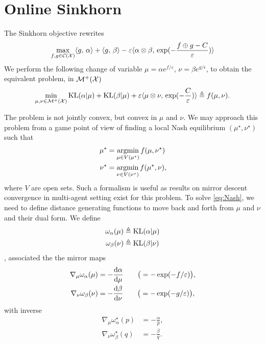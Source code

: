 \documentclass[a4paper, 10pt]{article}
\begin{document}
\section{Online Sinkhorn}

The Sinkhorn objective rewrites
\begin{equation}
    \max_{f, g \in \mathcal{C}(\mathcal{X})} \langle g,\,\alpha\rangle + \langle g,\,\beta\rangle
     - \varepsilon \langle \alpha \otimes \beta,\,\exp(-\frac{f \oplus g - C}{\varepsilon})
     \rangle
\end{equation}
We perform the following change of variable $\mu = \alpha e^{f / \varepsilon}$,
$\nu = \beta e^{g / \epsilon}$, to obtain the equivalent problem, in $\mathcal{M}^+(\mathcal{X})$
\begin{equation}
    \min_{\mu,\nu \in \mathcal{M}^+(\mathcal{X})} \text{KL}(\alpha|\mu) + \text{KL}(\beta|\mu) + 
    \varepsilon \langle \mu \otimes \nu,\,\exp(-\frac{C}{\varepsilon})\rangle \triangleq f(\mu, \nu).
\end{equation}

The problem is not jointly convex, but convex in $\mu$ and $\nu$.
We may approach this problem from a game point of view of finding
 a local Nash equilibrium $(\mu^\star,\nu^\star)$ such that
\begin{align}\label{eq:Nash}
    \mu^\star &= \operatorname*{argmin}_{\mu \in V(\mu^\star)} f(\mu, \nu^\star) \\
    \nu^\star &= \operatorname*{argmin}_{\nu \in V(\nu^\star)} f(\mu^\star, \nu),
\end{align}
where $V$ are open sets. Such a formalism is useful as results on mirror descent
convergence in multi-agent setting exist for this problem. To solve
\eqref{eq:Nash}, we need to define distance generating functions to move back
and forth from $\mu$ and $\nu$ and their dual form. We define
\begin{align}
    \omega_\alpha(\mu) &\triangleq \text{KL}(\alpha | \mu) \\
    \omega_\beta(\nu) &\triangleq \text{KL}(\beta | \nu) \\
\end{align},
associated the the mirror maps
\begin{align}
    \nabla_\mu \omega_\alpha(\mu) &= 
    - \frac{\textrm{d}\alpha}{\textrm{d}\mu} \qquad \big( = - \exp(-f / \varepsilon) \big), \\
    \nabla_\nu \omega_\beta(\nu) &= 
    - \frac{\textrm{d}\beta}{\textrm{d}\nu} \qquad \big( = - \exp(-g / \varepsilon) \big),
\end{align}
with inverse
\begin{align}
    \nabla_\mu \omega^\star_\alpha(p) &= - \frac{\alpha}{p}, \\
    \nabla_\nu \omega^\star_\beta(q) &= - \frac{\beta}{q}.
\end{align}
\end{document}
